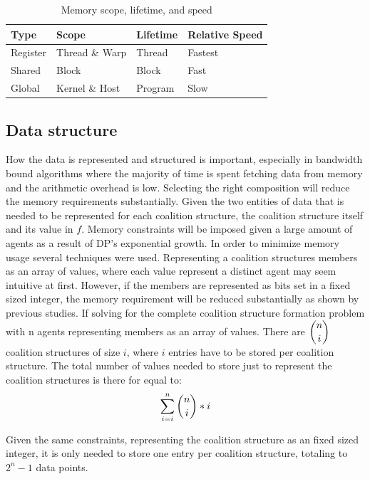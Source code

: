 \documentclass{aamas2012}
\begin{document}
\begin{table}
\centering
\caption{Memory scope, lifetime, and speed \label{mem}}
\begin{tabular}{|l|l|l|l|} \hline
Type&Scope&Lifetime&Relative Speed \\ \hline
Register&Thread \& Warp&Thread&Fastest\\
Shared&Block&Block&Fast\\
Global&Kernel \& Host&Program&Slow\\
\hline\end{tabular}
\end{table}

\subsection{Data structure} %
How the data is represented and structured is important, 
especially in bandwidth bound algorithms where the majority of time
is spent fetching data from memory and the arithmetic overhead is low.
Selecting the right composition will reduce the memory requirements substantially.
Given the two entities of data that is needed to be represented for each coalition structure, 
the coalition structure itself and its value in $f$. 
Memory constraints will be imposed given a large amount of agents as a result of DP's exponential growth. 
In order to minimize memory usage several techniques were used. 
Representing a coalition structures members as an array of values,
where each value represent a distinct agent may seem intuitive at first. 
However, if the members are represented as bits set in a fixed sized integer, the memory
requirement will be reduced substantially as shown by previous studies.\cite{boyer2012solving}
If solving for the complete coalition structure formation problem with n agents representing members as an array of values.
There are \begin{math}\dbinom{n}{i}\end{math} coalition structures of size $i$, where
$i$ entries have to be stored per coalition structure.
The total number of values needed to store just to represent the coalition structures is there for equal to:
\begin{displaymath}\sum_{i=i}^{n} \dbinom{n}{i}*i\end{displaymath}

Given the same constraints, representing the coalition structure as an fixed sized integer, it is only 
needed to store one entry per coalition structure, totaling to \begin{math}2^n-1\end{math} data points.
\end{document}
